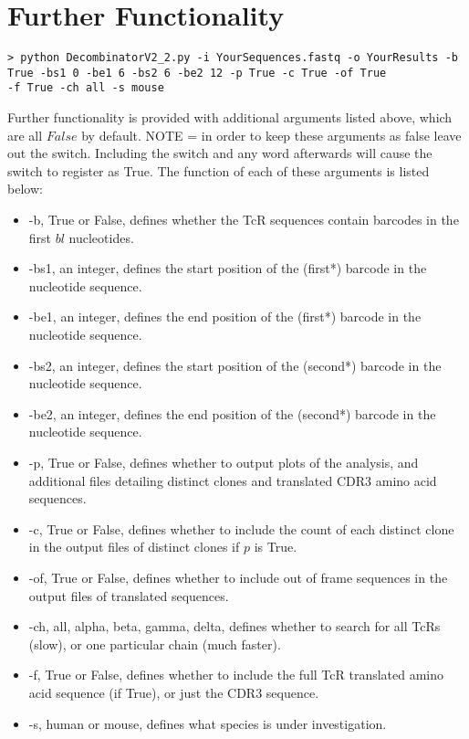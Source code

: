 \documentclass[10pt]{article}
\begin{document}
\FloatBarrier
\section*{Further Functionality}

\footnotesize
\begin{verbatim}
> python DecombinatorV2_2.py -i YourSequences.fastq -o YourResults -b True -bs1 0 -be1 6 -bs2 6 -be2 12 -p True -c True -of True
-f True -ch all -s mouse
\end{verbatim}
\normalsize

Further functionality is provided with additional arguments listed above, which are all $False$ by default. NOTE = in order to keep these arguments as false leave out the switch. Including the switch and any word afterwards will cause the switch to register as True. The function of each of these arguments is listed below:

\begin{itemize}
\item -b, True or False, defines whether the TcR sequences contain barcodes in the first $bl$ nucleotides.
\item -bs1, an integer, defines the start position of the (first*) barcode in the nucleotide sequence.
\item -be1, an integer, defines the end position of the (first*) barcode in the nucleotide sequence.
\item -bs2, an integer, defines the start position of the (second*) barcode in the nucleotide sequence.
\item -be2, an integer, defines the end position of the (second*) barcode in the nucleotide sequence.
\item -p, True or False, defines whether to output plots of the analysis, and additional files detailing distinct clones and translated CDR3 amino acid sequences.
\item -c, True or False, defines whether to include the count of each distinct clone in the output files of distinct clones if $p$ is True.
\item -of, True or False, defines whether to include out of frame sequences in the output files of translated sequences.
\item -ch, all, alpha, beta, gamma, delta, defines whether to search for all TcRs (slow), or one particular chain (much faster).
\item -f, True or False, defines whether to include the full TcR translated amino acid sequence (if True), or just the CDR3 sequence.
\item -s, human or mouse, defines what species is under investigation.
\end{itemize}
\end{document}
